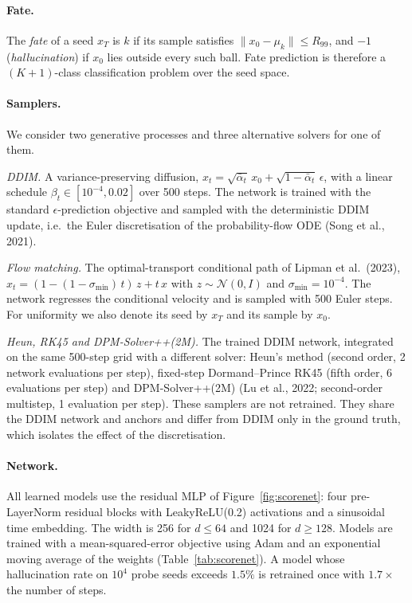 \documentclass[11pt]{article}
\begin{document}
\paragraph{Fate.}
The \emph{fate} of a seed $x_T$ is $k$ if its sample satisfies $\|x_0 - \mu_k\| \le R_{99}$, and
$-1$ (\emph{hallucination}) if $x_0$ lies outside every such ball. Fate prediction is therefore a
$(K + 1)$-class classification problem over the seed space.

\paragraph{Samplers.}
We consider two generative processes and three alternative solvers for one of them.

\textit{DDIM.} A variance-preserving diffusion,
$x_t = \sqrt{\bar\alpha_t}\, x_0 + \sqrt{1 - \bar\alpha_t}\, \epsilon$, with a linear schedule
$\beta_t \in [10^{-4}, 0.02]$ over 500 steps. The network is trained with the standard
$\epsilon$-prediction objective and sampled with the deterministic DDIM update, i.e.\ the Euler
discretisation of the probability-flow ODE (Song et al., 2021).

\textit{Flow matching.} The optimal-transport conditional path of Lipman et al.~(2023),
$x_t = (1 - (1 - \sigma_{\min})\,t)\, z + t\, x$ with $z \sim \mathcal{N}(0, I)$ and
$\sigma_{\min} = 10^{-4}$. The network regresses the conditional velocity and is sampled with 500
Euler steps. For uniformity we also denote its seed by $x_T$ and its sample by $x_0$.

\textit{Heun, RK45 and DPM-Solver++(2M).} The trained DDIM network, integrated on the same
500-step grid with a different solver: Heun's method (second order, 2 network evaluations per
step), fixed-step Dormand--Prince RK45 (fifth order, 6 evaluations per step) and DPM-Solver++(2M)
(Lu et al., 2022; second-order multistep, 1 evaluation per step). These samplers are not retrained.
They share the DDIM network and anchors and differ from DDIM only in the ground truth, which
isolates the effect of the discretisation.

\paragraph{Network.}
All learned models use the residual MLP of Figure~\ref{fig:scorenet}: four pre-LayerNorm residual
blocks with LeakyReLU(0.2) activations and a sinusoidal time embedding. The width is 256 for
$d \le 64$ and 1024 for $d \ge 128$. Models are trained with a mean-squared-error objective using
Adam and an exponential moving average of the weights (Table~\ref{tab:scorenet}). A model whose
hallucination rate on $10^4$ probe seeds exceeds $1.5\%$ is retrained once with $1.7\times$ the
number of steps.
\end{document}
